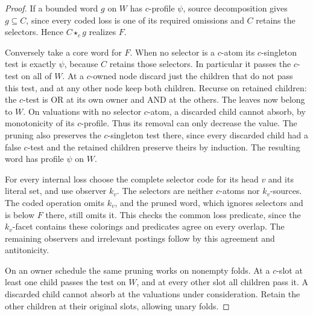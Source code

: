 \begin{proof}
If a bounded word $g$ on $W$ has $c$-profile $\psi$, source
decomposition gives $g\subseteq C$, since every coded loss is one
of its required omissions and $C$ retains the selectors. Hence
$C\star_c g$ realizes $F$.

Conversely take a core word for $F$. When no selector is a
$c$-atom its $c$-singleton test is exactly $\psi$, because $C$
retains those selectors. In particular it passes the $c$-test
on all of $W$. At a $c$-owned node discard just the children
that do not pass this test, and at any other node keep both
children. Recurse on retained children: the $c$-test is OR at
its own owner and AND at the others. The leaves now belong to $W$.
On valuations with no selector $c$-atom, a discarded child cannot
absorb, by monotonicity of its $c$-profile. Thus its removal can only
decrease the value. The pruning also preserves the $c$-singleton
test there, since every discarded child had a false $c$-test and
the retained children preserve theirs by induction. The resulting
word has profile $\psi$ on $W$.

For every internal loss choose the complete selector code for its
head $v$ and its literal set, and use observer $k_v$. The selectors
are neither $c$-atoms nor $k_v$-sources. The coded operation omits
$k_v$, and the pruned word, which ignores selectors and is below
$F$ there, still omits it. This checks the common loss predicate,
since the $k_v$-facet contains these colorings and predicates agree
on every overlap. The remaining observers and irrelevant postings
follow by this agreement and antitonicity.

On an owner schedule the same pruning works on nonempty folds.
At a $c$-slot at least one child passes the test on $W$, and at
every other slot all children pass it. A discarded child cannot
absorb at the valuations under consideration. Retain the other
children at their original slots, allowing unary folds.
\end{proof}

